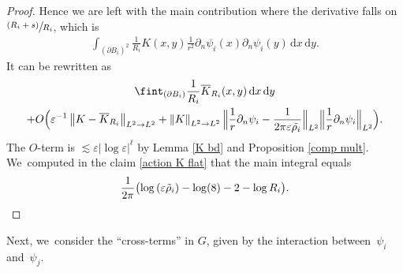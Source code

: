 \documentclass[JEP,XML,SOM,Unicode,published]{cedram}
\let\strokedint\fint
\let\epsilon\varepsilon
\newcommand{\psfrac}[2]{\sfrac{(#1)}{#2}}
\theoremstyle{definition}
\newcommand\norm[1]{\left\lVert #1\right\rVert}
\newcommand\Bnorm[1]{\Bigl\lVert #1\Bigr\rVert}
\newcommand\dd{\,\mathrm{d}}
\newcommand\dx{\dd x}
\newcommand\dy{\dd y}
\let\de\partial
\let\eps\epsilon
\begin{document}
\begin{proof}
Hence we are left with the main contribution where the derivative falls on $\psfrac{R_i+s}{R_i}$, which is
\begin{align*}
\int_{(\de B_i)^2}\frac{1}{R_i}K(x,y)\frac{1}{r^2}\de_n\psi_i(x)\de_n\psi_i(y)\dx\dy.
\end{align*}
It can be rewritten as
\begin{multline*}
\strokedint_{(\de B_i)}\frac{1}{R_i}\overline{K}_{R_i}(x,y)\dx\dy\\
+O\Bigl(\eps^{-1}\norm{K-\overline{K}_{R_i}}_{L^2\to L^2}+\norm{K}_{L^2\to L^2}\Bnorm{\frac{1}{r}\de_n\psi_i-\frac{1}{2\pi\eps\tilde{\rho_i}}}_{L^2}\Bnorm{\frac{1}{r}\de_n\psi_i}_{L^2}\Bigr).
\end{multline*}
The $O$-term is $\lesssim \eps|{\log\eps}|^\ell$ by Lemma \ref{K bd} and Proposition \ref{comp mult}. We~computed in the claim \eqref{action K flat} that the main integral equals
\[
\frac{1}{2\pi}\bigl(\log\left(\eps\tilde{\rho}_i\right)-\log(8)-2-\log R_i\bigr).\qedhere
\]
\end{proof}

Next, we~consider the ``cross-terms'' in $G$, given by the interaction between~$\psi_i$ and~$\psi_j$.
\end{document}
